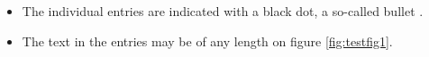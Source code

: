 \begin{itemize} \itemsep0em
  \item The individual entries are indicated with a black dot, a so-called bullet \cite{chua2010}.
  \item The text in the entries may be of any length on figure \ref{fig:testfig1}.
\end{itemize}
